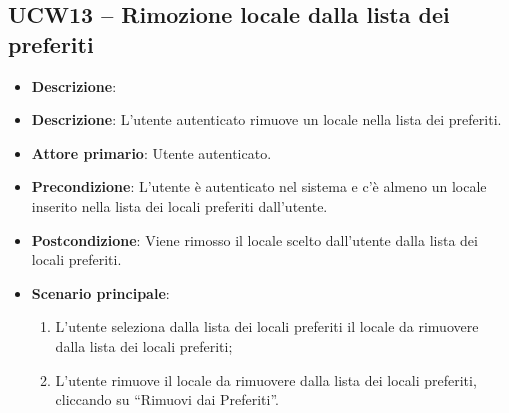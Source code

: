 \subsection{UCW13 – Rimozione locale dalla lista dei preferiti}
\begin{itemize}
    \item \textbf{Descrizione}:
	\item \textbf{Descrizione}: L'utente autenticato rimuove un locale nella lista dei preferiti.
    \item \textbf{Attore primario}: Utente autenticato.
    \item \textbf{Precondizione}:  L’utente è autenticato nel sistema e c'è almeno un locale inserito nella lista dei locali preferiti dall’utente.
    \item \textbf{Postcondizione}: Viene rimosso il locale scelto dall’utente dalla lista dei locali preferiti.
    \item \textbf{Scenario principale}:
    \begin{enumerate}
        \item L’utente seleziona dalla lista dei locali preferiti il locale da rimuovere dalla lista dei locali preferiti;
        \item L’utente rimuove il locale da rimuovere dalla lista dei locali preferiti, cliccando su “Rimuovi dai Preferiti”.
    \end{enumerate}
\end{itemize}

\pagebreak